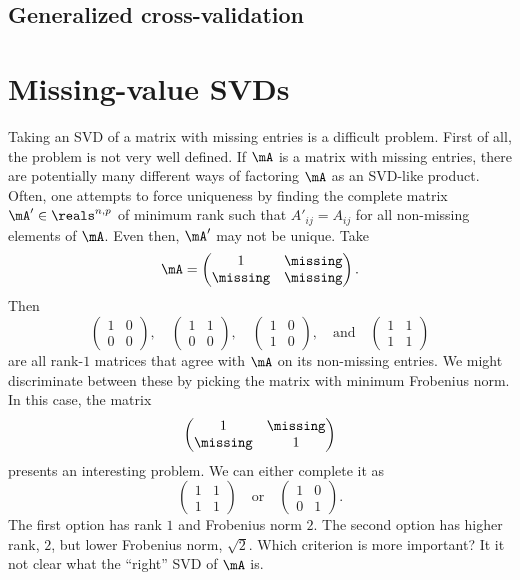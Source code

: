 \subsection{Generalized cross-validation}



\section{Missing-value SVDs}\label{S:missing-values-svds}

Taking an SVD of a matrix with missing entries is a difficult problem.  First of all, the problem is not very well defined.  If $\mA$ is a matrix with missing entries, there are potentially many different ways of factoring $\mA$ as an SVD-like product.  Often, one attempts to force uniqueness by finding the complete matrix $\mA' \in \reals^{n,p}$ of minimum rank such that $A'_{ij} = A_{ij}$ for all non-missing elements of $\mA$.  Even then, $\mA'$ may not be unique.  Take
\[
    \mA
    =
    \left(
    \begin{matrix}
        1        & \missing \\
        \missing & \missing
    \end{matrix}
    \right).
\]
Then
\[
    \left(
    \begin{matrix}
        1 & 0 \\
        0 & 0
    \end{matrix}
    \right),
    \quad
    \left(
    \begin{matrix}
        1 & 1 \\
        0 & 0
    \end{matrix}
    \right),
    \quad
    \left(
    \begin{matrix}
        1 & 0 \\
        1 & 0
    \end{matrix}
    \right),
    \quad
    \text{and}
    \quad
    \left(
    \begin{matrix}
        1 & 1 \\
        1 & 1
    \end{matrix}
    \right)
\]
are all rank-$1$ matrices that agree with $\mA$ on its non-missing entries.  We might discriminate between these by picking the matrix with minimum Frobenius norm.  In this case, the matrix
\[
    \left(
    \begin{matrix}
        1 & \missing \\
        \missing & 1
    \end{matrix}
    \right)
\]
presents an interesting problem.  We can either complete it as
\[
    \left(
    \begin{matrix}
        1 & 1 \\
        1 & 1
    \end{matrix}
    \right)
    \quad
    \text{or}
    \quad
    \left(
    \begin{matrix}
        1 & 0 \\
        0 & 1
    \end{matrix}
    \right).
\]
The first option has rank $1$ and Frobenius norm $2$.  The second option
has higher rank, $2$, but lower Frobenius norm, $\sqrt{2}$.  Which criterion 
is more important?  It it not clear what the ``right'' SVD of $\mA$ is.

